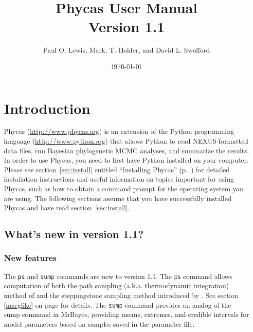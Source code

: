 \documentclass[10pt]{article}
\newcommand{\currPhycasVersion}{1.1}
\newcommand{\cmd}[1]{{\tt \small #1}\index{#1}}	%
\begin{document}
\title{{\sc Phycas User Manual} \\ Version \currPhycasVersion}
\author{Paul O. Lewis, Mark. T. Holder, and David L. Swofford}
\date{\today}
\maketitle

\tableofcontents

\section{Introduction}

Phycas (\url{http://www.phycas.org}) is an extension of the Python programming language (\url{http://www.python.org}) that allows Python to read NEXUS-formatted data files, run Bayesian phylogenetic MCMC analyses, and summarize the results. In order to use Phycas, you need to first have Python installed on your computer. Please see section~\ref{sec:install} entitled ``Installing Phycas'' (p.~\pageref{sec:install}) for detailed installation instructions and useful information on topics important for using Phycas, such as how to obtain a command prompt for the operating system you are using. The following sections assume that you have successfully installed Phycas and have read section~\ref{sec:install}.

\subsection{What's new in version 1.1?} %
\subsubsection{New features}
The \cmd{ps} and \cmd{sump} commands are new to version 1.1. The \cmd{ps} command allows computation of both the path sampling (a.k.a. thermodynamic integration) method of \citet{LartillotPhillippe2006} and the steppingstone sampling method introduced by \citet{XieLewisFanKuoChen2009}. See section \ref{marglike} on page \pageref{marglike} for details. The \cmd{sump} command provides an analog of the sump command in MrBayes, providing means, extremes, and credible intervals for model parameters based on samples saved in the parameter file.
\end{document}
